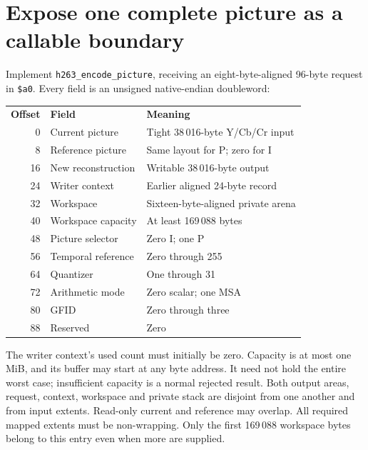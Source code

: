 \section{Expose one complete picture as a callable boundary}
Implement \texttt{h263\_encode\_picture}, receiving an eight-byte-aligned 96-byte
request in \texttt{\$a0}. Every field is an unsigned native-endian doubleword:
\begin{center}
  \begin{tabular}{rll}
    \textbf{Offset} & \textbf{Field}     & \textbf{Meaning}                   \\
    0               & Current picture    & Tight 38\,016-byte Y/Cb/Cr input   \\
    8               & Reference picture  & Same layout for P; zero for I      \\
    16              & New reconstruction & Writable 38\,016-byte output       \\
    24              & Writer context     & Earlier aligned 24-byte record     \\
    32              & Workspace          & Sixteen-byte-aligned private arena \\
    40              & Workspace capacity & At least 169\,088 bytes            \\
    48              & Picture selector   & Zero I; one P                      \\
    56              & Temporal reference & Zero through 255                   \\
    64              & Quantizer          & One through 31                     \\
    72              & Arithmetic mode    & Zero scalar; one MSA               \\
    80              & GFID               & Zero through three                 \\
    88              & Reserved           & Zero
  \end{tabular}
\end{center}
The writer context's used count must initially be zero. Capacity is at most one
MiB, and its buffer may start at any byte address. It need not hold the entire
worst case; insufficient capacity is a normal rejected result. Both output
areas, request, context, workspace and private stack are disjoint from one
another and from input extents. Read-only current and reference may overlap.
All required mapped extents must be non-wrapping. Only the first 169\,088 workspace
bytes belong to this entry even when more are supplied.

